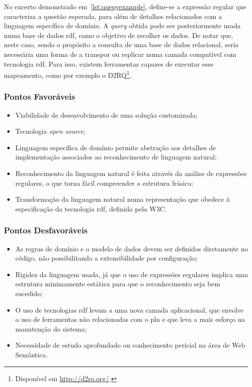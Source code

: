 No excerto demonstrado em~\ref{lst:quepyexample}, define-se a expressão regular que caracteriza a questão esperada, para além de detalhes relacionados com a linguagem específica de domínio. A \textit{query} obtida pode ser posteriormente usada numa base de dados \gls{rdf}, como o objetivo de recolher os dados. De notar que, neste caso, sendo o propósito a consulta de uma base de dados relacional, seria necessária uma forma de a transpor ou replicar numa camada compatível com tecnologia \gls{rdf}. Para isso, existem ferramentas capazes de executar esse mapeamento, como por exemplo o D2RQ\footnote{Disponível em \url{http://d2rq.org/}.}.

\subsubsection*{Pontos Favoráveis}
\begin{itemize}
    \item
    {
        Viabilidade de desenvolvimento de uma solução customizada;
    }
    \item
    {
        Tecnologia \textit{open source};
    }
    \item 
    {
        Linguagem específica de domínio permite abstração aos detalhes de implementação associados ao reconhecimento de linguagem natural;
    }
    \item
    {
        Reconhecimento da linguagem natural é feita através da análise de expressões regulares, o que torna fácil compreender a estrutura frásica;
    }
    \item
    {
        Transformação da linguagem natural numa representação que obedece à especificação da tecnologia \gls{rdf}, definida pela W3C.
    }
\end{itemize}

\subsubsection*{Pontos Desfavoráveis}
\begin{itemize}
    \item
    {
        As regras de domínio e o modelo de dados devem ser definidos diretamente no código, não possibilitando a extensibilidade por configuração;
    }
    \item
    {
        Rigidez da linguagem usada, já que o uso de expressões regulares implica uma estrutura minimamente estática para que o reconhecimento seja bem sucedido;
    }
    \item
    {
        O uso de tecnologias \gls{rdf} levam a uma nova camada aplicacional, que envolve o uso de ferramentas não relacionadas com o \gls{pln} e que leva a mais esforço na manutenção do sistema;
    }
    \item
    {
        Necessidade de estudo aprofundado ou conhecimento pericial na área de Web Semântica.
    }
\end{itemize}

